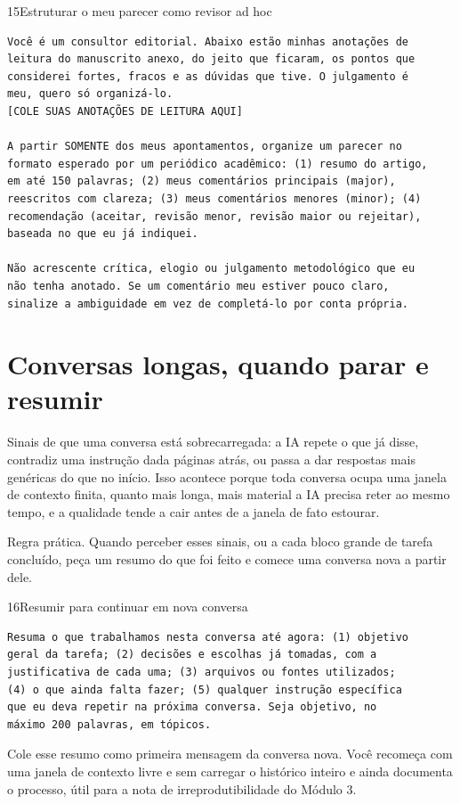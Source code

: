 \documentclass[11pt,a4paper]{article}
\begin{document}
\begin{modelo}{15}{Estruturar o meu parecer como revisor ad hoc}
\begin{lstlisting}
Você é um consultor editorial. Abaixo estão minhas anotações de
leitura do manuscrito anexo, do jeito que ficaram, os pontos que
considerei fortes, fracos e as dúvidas que tive. O julgamento é
meu, quero só organizá-lo.
[COLE SUAS ANOTAÇÕES DE LEITURA AQUI]

A partir SOMENTE dos meus apontamentos, organize um parecer no
formato esperado por um periódico acadêmico: (1) resumo do artigo,
em até 150 palavras; (2) meus comentários principais (major),
reescritos com clareza; (3) meus comentários menores (minor); (4)
recomendação (aceitar, revisão menor, revisão maior ou rejeitar),
baseada no que eu já indiquei.

Não acrescente crítica, elogio ou julgamento metodológico que eu
não tenha anotado. Se um comentário meu estiver pouco claro,
sinalize a ambiguidade em vez de completá-lo por conta própria.
\end{lstlisting}
\end{modelo}

\section{Conversas longas, quando parar e resumir}
\small
Sinais de que uma conversa está sobrecarregada: a IA repete o que já disse, contradiz uma instrução dada páginas atrás, ou passa a dar respostas mais genéricas do que no início. Isso acontece porque toda conversa ocupa uma janela de contexto finita, quanto mais longa, mais material a IA precisa reter ao mesmo tempo, e a qualidade tende a cair antes de a janela de fato estourar.
\begin{dica}
Regra prática. Quando perceber esses sinais, ou a cada bloco grande de tarefa concluído, peça um resumo do que foi feito e comece uma conversa nova a partir dele.
\end{dica}

\begin{modelo}{16}{Resumir para continuar em nova conversa}
\begin{lstlisting}
Resuma o que trabalhamos nesta conversa até agora: (1) objetivo
geral da tarefa; (2) decisões e escolhas já tomadas, com a
justificativa de cada uma; (3) arquivos ou fontes utilizados;
(4) o que ainda falta fazer; (5) qualquer instrução específica
que eu deva repetir na próxima conversa. Seja objetivo, no
máximo 200 palavras, em tópicos.
\end{lstlisting}
\end{modelo}
\vspace{2pt}
Cole esse resumo como primeira mensagem da conversa nova. Você recomeça com uma janela de contexto livre e sem carregar o histórico inteiro e ainda documenta o processo, útil para a nota de irreprodutibilidade do Módulo 3.
\end{document}
